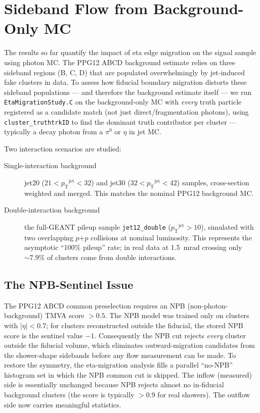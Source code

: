 \documentclass[11pt,letterpaper]{article}
\newcommand{\pp}{\mbox{$p$+$p$}}
\newcommand{\pT}{\ensuremath{p_{\text{T}}}}
\newcommand{\abseta}{\ensuremath{|\eta|}}
\begin{document}
\clearpage
\section{Sideband Flow from Background-Only MC}
\label{sec:bkg_flow}

The results so far quantify the impact of eta edge migration on the signal
sample using photon MC. The PPG12 ABCD background estimate relies on three
sideband regions (B, C, D) that are populated overwhelmingly by jet-induced
fake clusters in data. To assess how fiducial boundary migration distorts
these sideband populations --- and therefore the background estimate itself
--- we run \texttt{EtaMigrationStudy.C} on the background-only MC with
\emph{every} truth particle registered as a candidate match (not just
direct/fragmentation photons), using \texttt{cluster\_truthtrkID} to find the
dominant truth contributor per cluster --- typically a decay photon from a
$\pi^{0}$ or $\eta$ in jet MC.

Two interaction scenarios are studied:
\begin{description}
  \item[Single-interaction background] jet20 ($21 < \pT^\text{jet} < 32$) and
    jet30 ($32 < \pT^\text{jet} < 42$) samples, cross-section weighted and
    merged. This matches the nominal PPG12 background MC.
  \item[Double-interaction background] the full-GEANT pileup sample
    \texttt{jet12\_double} ($\pT^\text{jet} > 10$), simulated with two
    overlapping \pp{} collisions at nominal luminosity. This represents the
    asymptotic ``100\% pileup'' rate; in real data at 1.5~mrad crossing only
    ${\sim}7.9\%$ of clusters come from double interactions.
\end{description}

\subsection{The NPB-Sentinel Issue}
\label{subsec:bkg_npb_sentinel}

The PPG12 ABCD common preselection requires an NPB (non-photon-background) TMVA
score $> 0.5$. The NPB model was trained only on clusters with $\abseta < 0.7$;
for clusters reconstructed outside the fiducial, the stored NPB score is the
sentinel value $-1$. Consequently the NPB cut rejects \emph{every} cluster
outside the fiducial volume, which eliminates outward-migration candidates from
the shower-shape sidebands before any flow measurement can be made. To restore
the symmetry, the eta-migration analysis fills a parallel ``no-NPB'' histogram
set in which the NPB common cut is skipped. The inflow (measured) side is
essentially unchanged because NPB rejects almost no in-fiducial background
clusters (the score is typically $> 0.9$ for real showers). The outflow side
now carries meaningful statistics.
\end{document}
